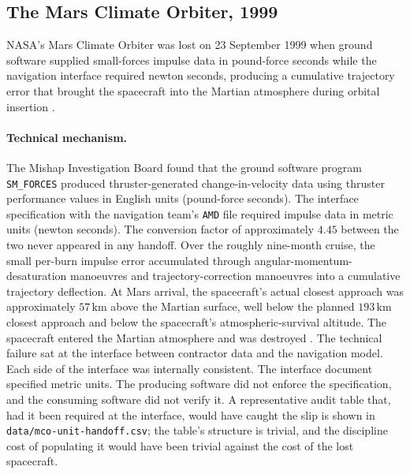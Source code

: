\subsection{The Mars Climate Orbiter, 1999}

NASA's Mars Climate Orbiter was lost on 23 September 1999 when ground
software supplied small-forces impulse data in pound-force seconds
while the navigation interface required newton seconds, producing a
cumulative trajectory error that brought the spacecraft into the
Martian atmosphere during orbital insertion \cite{acc:nasa-mco-mib}.

\paragraph{Technical mechanism.}
The Mishap Investigation Board found that the ground software
program \texttt{SM\_FORCES} produced thruster-generated
change-in-velocity data using thruster performance values in English
units (pound-force seconds). The interface specification with the
navigation team's \texttt{AMD} file required impulse data in metric
units (newton seconds). The conversion factor of approximately
$4.45$ between the two never appeared in any handoff. Over the
roughly nine-month cruise, the small per-burn impulse error
accumulated through angular-momentum-desaturation manoeuvres and
trajectory-correction manoeuvres into a cumulative trajectory
deflection. At Mars arrival, the spacecraft's actual closest
approach was approximately $57 \,\si{\kilo\meter}$ above the Martian
surface, well below the planned $193 \,\si{\kilo\meter}$ closest
approach and below the spacecraft's atmospheric-survival altitude.
The spacecraft entered the Martian atmosphere and was destroyed
\cite{acc:nasa-mco-mib}. The technical failure sat at the interface
between contractor data and the navigation model. Each side of the
interface was internally consistent. The interface document
specified metric units. The producing software did not enforce the
specification, and the consuming software did not verify it. A
representative audit table that, had it been required at the
interface, would have caught the slip is shown in
\texttt{data/mco-unit-handoff.csv}; the table's structure is
trivial, and the discipline cost of populating it would have been
trivial against the cost of the lost spacecraft.

